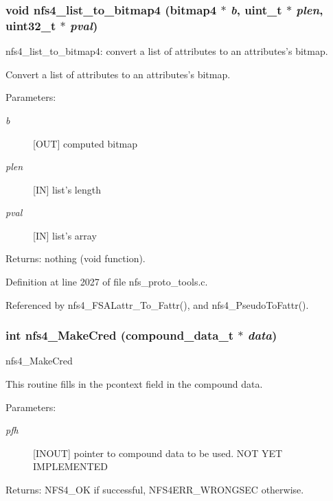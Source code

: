 \subsubsection{\setlength{\rightskip}{0pt plus 5cm}void nfs4\_\-list\_\-to\_\-bitmap4 (bitmap4 $\ast$ {\em b}, uint\_\-t $\ast$ {\em plen}, uint32\_\-t $\ast$ {\em pval})}\label{nfs__proto__tools_8c_a17}


nfs4\_\-list\_\-to\_\-bitmap4: convert a list of attributes to an attributes's bitmap.

Convert a list of attributes to an attributes's bitmap.

\begin{Desc}
\item[Parameters:]
\begin{description}
\item[{\em b}][OUT] computed bitmap \item[{\em plen}][IN] list's length \item[{\em pval}][IN] list's array\end{description}
\end{Desc}
\begin{Desc}
\item[Returns:]nothing (void function). \end{Desc}


Definition at line 2027 of file nfs\_\-proto\_\-tools.c.

Referenced by nfs4\_\-FSALattr\_\-To\_\-Fattr(), and nfs4\_\-Pseudo\-To\-Fattr().
\subsubsection{\setlength{\rightskip}{0pt plus 5cm}int nfs4\_\-Make\-Cred (compound\_\-data\_\-t $\ast$ {\em data})}\label{nfs__proto__tools_8c_a30}


nfs4\_\-Make\-Cred

This routine fills in the pcontext field in the compound data.

\begin{Desc}
\item[Parameters:]
\begin{description}
\item[{\em pfh}][INOUT] pointer to compound data to be used. NOT YET IMPLEMENTED\end{description}
\end{Desc}
\begin{Desc}
\item[Returns:]NFS4\_\-OK if successful, NFS4ERR\_\-WRONGSEC otherwise. \end{Desc}



